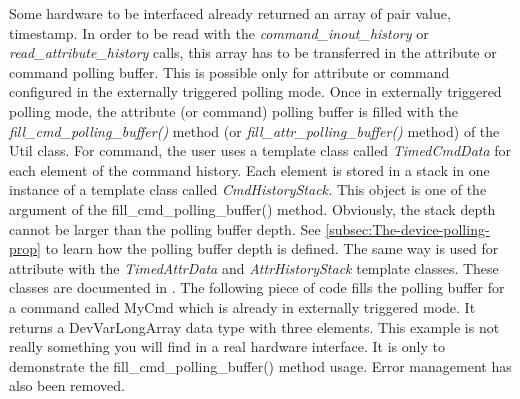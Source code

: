 Some hardware to be interfaced already returned an array of pair value,
timestamp. In order to be read with the \emph{command\_inout\_history}
or \emph{read\_attribute\_history} calls, this array has to be transferred
in the attribute or command polling buffer. This is possible only
for attribute or command configured in the externally triggered polling
mode. Once in externally triggered polling mode, the attribute (or
command) polling buffer is filled with the \emph{fill\_cmd\_polling\_buffer()}
method (or \emph{fill\_attr\_polling\_buffer()}
method) of the Util class. For command, the user uses a template class
called \emph{TimedCmdData} for each element of
the command history. Each element is stored in a stack in one instance
of a template class called \emph{CmdHistoryStack.}
This object is one of the argument of the fill\_cmd\_polling\_buffer()
method. Obviously, the stack depth cannot be larger than the polling
buffer depth. See \ref{subsec:The-device-polling-prop} to learn how
the polling buffer depth is defined. The same way is used for attribute
with the \emph{TimedAttrData} and \emph{AttrHistoryStack}
template classes. These classes are documented in \cite{TANGO_ref_man}.
The following piece of code fills the polling buffer for a command
called MyCmd which is already in externally triggered mode. It returns
a DevVarLongArray data type with three elements. This example is not
really something you will find in a real hardware interface. It is
only to demonstrate the fill\_cmd\_polling\_buffer() method usage.
Error management has also been removed.



